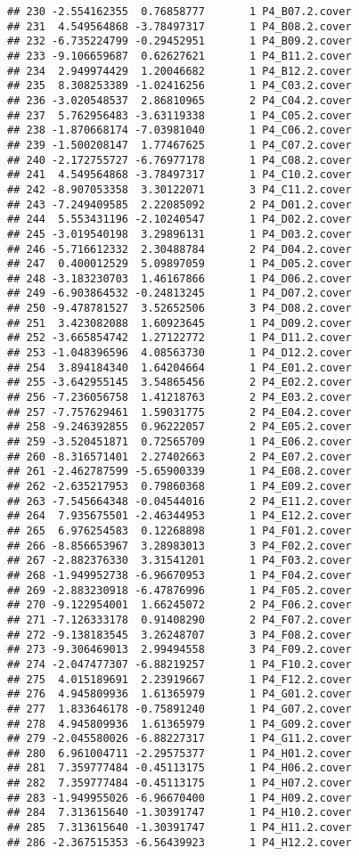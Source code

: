 \documentclass[]{article}
\begin{document}
\begin{verbatim}
## 230 -2.554162355  0.76858777       1 P4_B07.2.cover
## 231  4.549564868 -3.78497317       1 P4_B08.2.cover
## 232 -6.735224799 -0.29452951       1 P4_B09.2.cover
## 233 -9.106659687  0.62627621       1 P4_B11.2.cover
## 234  2.949974429  1.20046682       1 P4_B12.2.cover
## 235  8.308253389 -1.02416256       1 P4_C03.2.cover
## 236 -3.020548537  2.86810965       2 P4_C04.2.cover
## 237  5.762956483 -3.63119338       1 P4_C05.2.cover
## 238 -1.870668174 -7.03981040       1 P4_C06.2.cover
## 239 -1.500208147  1.77467625       1 P4_C07.2.cover
## 240 -2.172755727 -6.76977178       1 P4_C08.2.cover
## 241  4.549564868 -3.78497317       1 P4_C10.2.cover
## 242 -8.907053358  3.30122071       3 P4_C11.2.cover
## 243 -7.249409585  2.22085092       2 P4_D01.2.cover
## 244  5.553431196 -2.10240547       1 P4_D02.2.cover
## 245 -3.019540198  3.29896131       1 P4_D03.2.cover
## 246 -5.716612332  2.30488784       2 P4_D04.2.cover
## 247  0.400012529  5.09897059       1 P4_D05.2.cover
## 248 -3.183230703  1.46167866       1 P4_D06.2.cover
## 249 -6.903864532 -0.24813245       1 P4_D07.2.cover
## 250 -9.478781527  3.52652506       3 P4_D08.2.cover
## 251  3.423082088  1.60923645       1 P4_D09.2.cover
## 252 -3.665854742  1.27122772       1 P4_D11.2.cover
## 253 -1.048396596  4.08563730       1 P4_D12.2.cover
## 254  3.894184340  1.64204664       1 P4_E01.2.cover
## 255 -3.642955145  3.54865456       2 P4_E02.2.cover
## 256 -7.236056758  1.41218763       2 P4_E03.2.cover
## 257 -7.757629461  1.59031775       2 P4_E04.2.cover
## 258 -9.246392855  0.96222057       2 P4_E05.2.cover
## 259 -3.520451871  0.72565709       1 P4_E06.2.cover
## 260 -8.316571401  2.27402663       2 P4_E07.2.cover
## 261 -2.462787599 -5.65900339       1 P4_E08.2.cover
## 262 -2.635217953  0.79860368       1 P4_E09.2.cover
## 263 -7.545664348 -0.04544016       2 P4_E11.2.cover
## 264  7.935675501 -2.46344953       1 P4_E12.2.cover
## 265  6.976254583  0.12268898       1 P4_F01.2.cover
## 266 -8.856653967  3.28983013       3 P4_F02.2.cover
## 267 -2.882376330  3.31541201       1 P4_F03.2.cover
## 268 -1.949952738 -6.96670953       1 P4_F04.2.cover
## 269 -2.883230918 -6.47876996       1 P4_F05.2.cover
## 270 -9.122954001  1.66245072       2 P4_F06.2.cover
## 271 -7.126333178  0.91408290       2 P4_F07.2.cover
## 272 -9.138183545  3.26248707       3 P4_F08.2.cover
## 273 -9.306469013  2.99494558       3 P4_F09.2.cover
## 274 -2.047477307 -6.88219257       1 P4_F10.2.cover
## 275  4.015189691  2.23919667       1 P4_F12.2.cover
## 276  4.945809936  1.61365979       1 P4_G01.2.cover
## 277  1.833646178 -0.75891240       1 P4_G07.2.cover
## 278  4.945809936  1.61365979       1 P4_G09.2.cover
## 279 -2.045580026 -6.88227317       1 P4_G11.2.cover
## 280  6.961004711 -2.29575377       1 P4_H01.2.cover
## 281  7.359777484 -0.45113175       1 P4_H06.2.cover
## 282  7.359777484 -0.45113175       1 P4_H07.2.cover
## 283 -1.949955026 -6.96670400       1 P4_H09.2.cover
## 284  7.313615640 -1.30391747       1 P4_H10.2.cover
## 285  7.313615640 -1.30391747       1 P4_H11.2.cover
## 286 -2.367515353 -6.56439923       1 P4_H12.2.cover
\end{verbatim}
\end{document}
